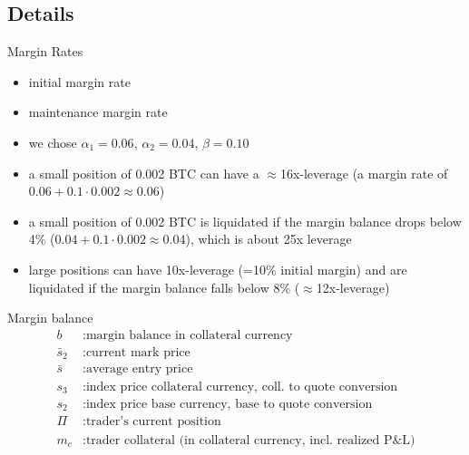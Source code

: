 \documentclass[10pt,a4paper]{article}
\begin{document}
\begin{multicols}{3}
\section{Details}
\begin{textbox}{Margin Rates}
    \begin{itemize}
        \item initial margin rate\\
        \item maintenance margin rate \\ 
        \item we chose $\alpha_1=0.06$, $\alpha_2=0.04$, $\beta=0.10$
        \item a small position of 0.002 BTC can have a $\approx$16x-leverage
        (a margin rate of $0.06+0.1\cdot 0.002 \approx 0.06$)
        \item a small position of 0.002 BTC is liquidated if the margin balance drops below 4\% 
        ($0.04+0.1\cdot 0.002 \approx 0.04$), which is about 25x leverage
        \item large positions can have 10x-leverage (=10\% initial margin) and are liquidated if
        the margin balance falls below 8\% ($\approx$12x-leverage)
    \end{itemize}

\end{textbox}

\begin{textbox}{Margin balance}
    \begin{align}
 b &: \text{margin balance in collateral currency}\\
 \bar{s}_2 &: \text{current mark price}\\
 \bar{s} &: \text{average entry price}\\
 s_3 &: \text{index price collateral currency, coll.\ to quote conversion}\\
 s_2 &: \text{index price base currency, base to quote conversion}\\
 \Pi   &: \text{trader's current position}\\
  m_c &: \text{trader collateral (in collateral currency, incl. realized P\&L)}
\end{align}
\end{textbox}


\end{multicols}
\end{document}
